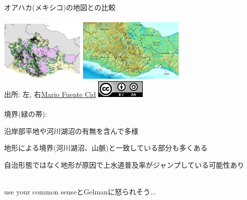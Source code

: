 \begin{frame}{}
オアハカ(メキシコ)の地図との比較\\~\\
\hfil\includegraphics[width = 4cm]{ImpactEvaluation/figure/Magaloni_MexicoUsosFig1NoCaption.jpg}
\includegraphics[width = 5cm]{ImpactEvaluation/figure/Oaxaca_fisico_regiones.png}\\
{\footnotesize 出所: 左\citet[][Figure 1]{Magaloni2019}, 右\href{https://commons.wikimedia.org/wiki/Image:Topographic30deg_N0W90.png}{Mario Fuente Cid} \includegraphics[height = .3cm]{ImpactEvaluation/figure/CCBy-SA.jpg}}\\~\\
\pause
境界(緑の帯):
\begin{dinglist}{43}
\vspace{1.0ex}\setlength{\itemsep}{1.0ex}\setlength{\baselineskip}{12pt}
\pause
\item	沿岸部平地や河川湖沼の有無を含んで多様
\pause
\item	地形による境界(河川湖沼、山脈)と一致している部分も多くある
\pause
\item	自治形態ではなく地形が原因で上水道普及率がジャンプしている可能性あり\\~\\
\end{dinglist}
\pause
use your common senseとGelmanに怒られそう...
\end{frame}


